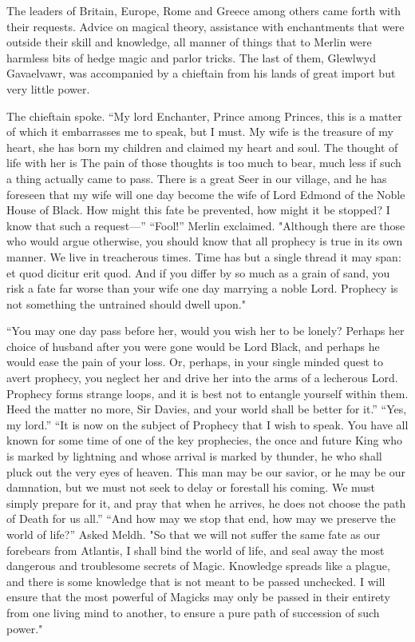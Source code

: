 The leaders of Britain, Europe, Rome and Greece among others came forth with their requests. Advice on magical theory, assistance with enchantments that were outside their skill and knowledge, all manner of things that to Merlin were harmless bits of hedge magic and parlor tricks. The last of them, Glewlwyd Gavaelvawr, was accompanied by a chieftain from his lands of great import but very little power.

The chieftain spoke. “My lord Enchanter, Prince among Princes, this is a matter of which it embarrasses me to speak, but I must. My wife is the treasure of my heart, she has born my children and claimed my heart and soul. The thought of life with her is{\el} The pain of those thoughts is too much to bear, much less if such a thing actually came to pass. There is a great Seer in our village, and he has foreseen that my wife will one day become the wife of Lord Edmond of the Noble House of Black. How might this fate be prevented, how might it be stopped? I know that such a request\mbox{---}”
\SmallVSpace
“Fool!” Merlin exclaimed. "Although there are those who would argue otherwise, you should know that all prophecy is true in its own manner. We live in treacherous times. Time has but a single thread it may span: et quod dicitur erit quod. And if you differ by so much as a grain of sand, you risk a fate far worse than your wife one day marrying a noble Lord. Prophecy is not something the untrained should dwell upon."

“You may one day pass before her, would you wish her to be lonely? Perhaps her choice of husband after you were gone would be Lord Black, and perhaps he would ease the pain of your loss. Or, perhaps, in your single minded quest to avert prophecy, you neglect her and drive her into the arms of a lecherous Lord. Prophecy forms strange loops, and it is best not to entangle yourself within them. Heed the matter no more, Sir Davies, and your world shall be better for it.”
\SmallVSpace
“Yes, my lord.”
\SmallVSpace
“It is now on the subject of Prophecy that I wish to speak. You have all known for some time of one of the key prophecies, the once and future King who is marked by lightning and whose arrival is marked by thunder, he who shall pluck out the very eyes of heaven. This man may be our savior, or he may be our damnation, but we must not seek to delay or forestall his coming. We must simply prepare for it, and pray that when he arrives, he does not choose the path of Death for us all.”
\SmallVSpace
“And how may we stop that end, how may we preserve the world of life?” Asked Meldh.
\SmallVSpace
"So that we will not suffer the same fate as our forebears from Atlantis, I shall bind the world of life, and seal away the most dangerous and troublesome secrets of Magic. Knowledge spreads like a plague, and there is some knowledge that is not meant to be passed unchecked. I will ensure that the most powerful of Magicks may only be passed in their entirety from one living mind to another, to ensure a pure path of succession of such power."

